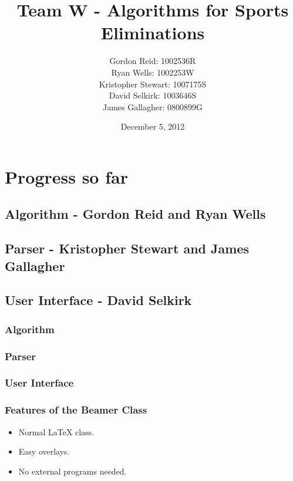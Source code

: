\documentclass{beamer}
\title{Team W - Algorithms for Sports Eliminations}
\author{
    Gordon Reid: 1002536R\\
    Ryan Wells: 1002253W\\
    Kristopher Stewart: 1007175S\\
    David Selkirk: 1003646S\\
    James Gallagher: 0800899G\\
}
\date{December 5, 2012}
\begin{document}
\frame{\titlepage}

\section[Outline]{}
\frame{\tableofcontents}

\section{Progress so far}
\subsection{Algorithm - Gordon Reid and Ryan Wells}
\subsection{Parser - Kristopher Stewart and James Gallagher}
\subsection{User Interface - David Selkirk}
\frame
{
	\frametitle{Algorithm}
}
\frame
{
	\frametitle{Parser}
}
\frame
{
	\frametitle{User Interface}
}

\frame
{
  \frametitle{Features of the Beamer Class}

  \begin{itemize}
  \item<1-> Normal LaTeX class.
  \item<2-> Easy overlays.
  \item<3-> No external programs needed.      
  \end{itemize}
}
\end{document}
